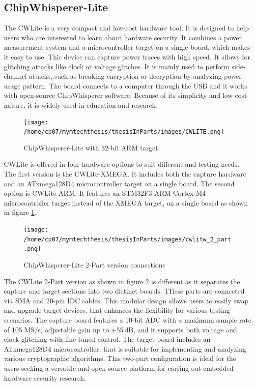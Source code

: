 \subsection{ChipWhisperer-Lite}
The CWLite is a very compact and low-cost hardware tool. It is designed to help users who are interested to learn about hardware security. It combines a power measurement system and a microcontroller target on a single board, which makes it easy to use. This device \cite{chipwhisperer_lite_capture} can capture power traces with high speed. It allows for glitching attacks like clock or voltage glitches. It is mainly used to perform side-channel attacks, such as breaking encryption or decryption by analyzing power usage pattern. The board connects to a computer through the USB and it works with open-source ChipWhisperer software. Because of its simplicity and low cost nature, it is widely used in education and research.
\begin{figure}[h]
    \centering
    \texttt{[image: /home/cp07/mymtechthesis/thesisInParts/images/CWLITE.png]}
    \caption{ChipWhisperer-Lite with 32-bit ARM target}
    \label{lite_target}
\end{figure}\newline
CWLite is offered in four hardware options \cite{chipwhisperer_lite2} to suit different and testing needs. The first version is the CWLite-XMEGA. It includes both the capture hardware and an ATxmega128D4 microcontroller target on a single board. The second option is CWLite-ARM. It features an STM32F3 ARM Cortex-M4 microcontroller target instead of the XMEGA target, on a single board as shown in figure \ref{lite_target}. 
\begin{figure}[h]
    \centering
    \texttt{[image: /home/cp07/mymtechthesis/thesisInParts/images/cwlitw\_2\_part.png]}
    \caption{ChipWhisperer-Lite 2-Part version connections}
    \label{fig:lite_2_part}
\end{figure}\newline
The CWLite 2-Part version as shown in figure \ref{fig:lite_2_part} is different as it separates the capture and target sections into two distinct boards. THese parts are connected via SMA and 20-pin IDC cables. This modular design allows users to easily swap and upgrade target devices, that enhances the flexibility for various testing scenarios. The capture board features a 10-bit ADC with a maximum sample rate of 105 MS/s, adjustable gain up to +55\,dB, and it supports both voltage and clock glitching with fine-tuned control. The target board includes an ATxmega128D4 microcontroller, that is suitable for implementing and analyzing various cryptographic algorithms. This two-part configuration is ideal for the users seeking a versatile and open-source platform for carring out embedded hardware security research.\newline
